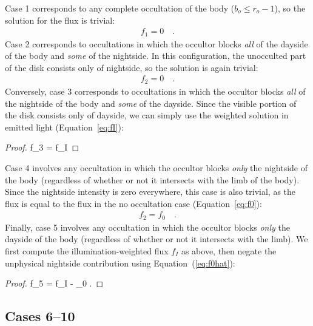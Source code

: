 \documentclass[modern]{aastex62}
\begin{document}
Case 1 corresponds to any complete occultation of the body
($b_o \le r_o - 1$), so the solution for the flux is trivial:
%
\begin{align}
    \label{eq:f1}
    f_1 = 0
    \quad.
\end{align}
%
Case 2 corresponds to occultations in which the occultor blocks \emph{all} of
the dayside of the body and \emph{some} of the nightside. In this
configuration, the unocculted part of the disk consists only of nightside, so
the solution is again trivial:
%
\begin{align}{}
    \label{eq:f2}
    f_2 = 0
    \quad.
\end{align}
%
Conversely, case 3 corresponds to occultations in which the occultor blocks
\emph{all} of the nightside of the body and \emph{some} of the dayside.
Since the visible portion of the disk consists only of dayside, we can
simply use the weighted solution in emitted light
(Equation~\ref{eq:fI}):
%
\begin{proof}{}
    \label{eq:f3}
    f_3 = f_I
\end{proof}
%
Case 4 involves any occultation in which the occultor blocks \emph{only} the
nightside of the body (regardless of whether or not it intersects with the
limb of the body). Since the nightside intensity is zero everywhere, this case
is also trivial, as the flux is equal to the flux in the no occultation case
(Equation~\ref{eq:f0}):
%
\begin{align}
    \label{eq:f4}
    f_2 = f_0
    \quad.
\end{align}
%
Finally, case 5 involves any occultation in which the occultor blocks
\emph{only} the dayside of the body (regardless of whether or not it
intersects with the limb). We first compute the illumination-weighted flux
$f_I$ as above, then negate the unphysical nightside contribution
using Equation~(\ref{eq:f0hat}):
%
\begin{proof}{}
    \label{eq:f5}
    f_5 = f_I - _0
    \quad.
\end{proof}

%

\subsection{Cases 6--10}
\label{sec:cases-hard}
%
\end{document}

